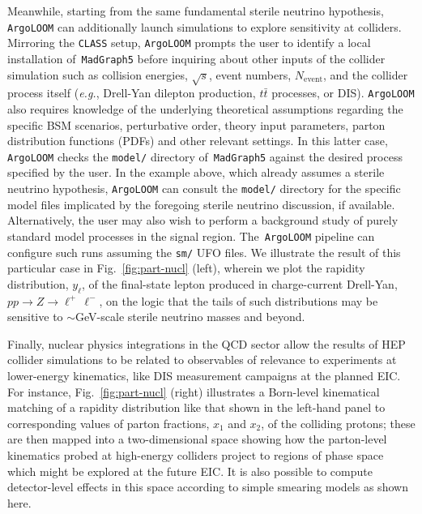\documentclass[final,3p,times,sort,compress]{elsarticle}
\newcommand{\AL}{\texttt{ArgoLOOM}\xspace}
\newcommand{\CLASS}{\texttt{CLASS}\xspace}
\newcommand{\MG}{\texttt{MadGraph5}\xspace}
\begin{document}
Meanwhile, starting from the same fundamental sterile neutrino hypothesis, \AL can additionally
launch simulations to explore sensitivity at colliders.
%
Mirroring the \CLASS setup, \AL prompts the user to identify a local installation of~\MG before inquiring about other inputs of the collider simulation such as collision energies, $\sqrt{s}$, event numbers, $N_\mathrm{event}$, and the collider process itself ({\it e.g.}, Drell-Yan dilepton production, $t\bar{t}$ processes, or DIS). \AL also requires knowledge of the underlying theoretical assumptions regarding the specific BSM scenarios, perturbative order, theory input parameters, parton distribution functions (PDFs) and other relevant settings.
%
In this latter case, \AL checks the \texttt{model/} directory of~\MG against the desired process specified by the user. In the example above, which already assumes a sterile neutrino hypothesis, \AL can consult the \texttt{model/} directory for the specific model files implicated by the foregoing sterile neutrino discussion, if available.
%
Alternatively, the user may also wish to perform a background study of purely standard model processes in the signal region. The~\AL pipeline can configure such runs assuming the \texttt{sm/} UFO files.
%
We illustrate the result of this particular case in Fig.~\ref{fig:part-nucl} (left), wherein we plot the rapidity distribution, $y_\ell$, of the final-state lepton produced in charge-current Drell-Yan, $pp \to Z \to \ell^+\, \ell^-$, on the logic that the tails of such distributions may be sensitive to $\sim$GeV-scale sterile neutrino masses and beyond.

Finally, nuclear physics integrations in the QCD sector allow the results of HEP collider
simulations to be related to observables of relevance to experiments at lower-energy kinematics, like DIS measurement campaigns at the planned EIC.
%
For instance, Fig.~\ref{fig:part-nucl} (right) illustrates a Born-level kinematical
matching of a rapidity distribution like that shown in the left-hand panel to corresponding
values of parton fractions, $x_1$ and $x_2$, of the colliding protons; these are then
mapped into a two-dimensional space showing how the parton-level kinematics probed at high-energy
colliders project to regions of phase space which might be explored at the future EIC. It is also possible to compute detector-level effects in this space according to simple smearing models as shown here.
\end{document}

